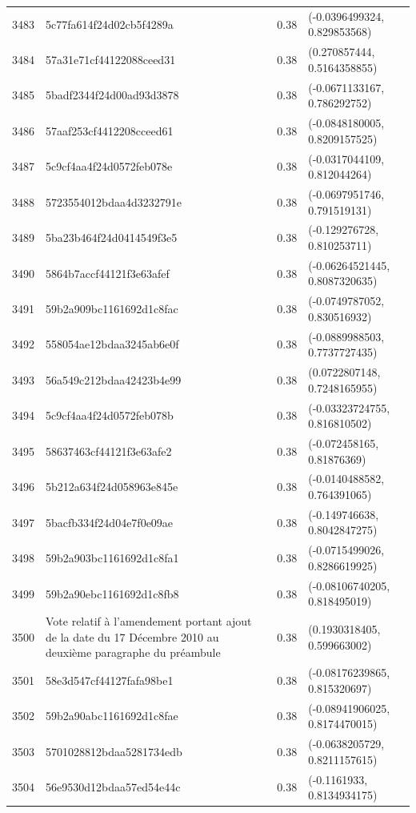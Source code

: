 \begin{table}[ht]
\begin{tabular}{rlrl}
  3483 & 5c77fa614f24d02cb5f4289a & 0.38 & (-0.0396499324, 0.829853568) \\ 
  3484 & 57a31e71cf44122088ceed31 & 0.38 & (0.270857444, 0.5164358855) \\ 
  3485 & 5badf2344f24d00ad93d3878 & 0.38 & (-0.0671133167, 0.786292752) \\ 
  3486 & 57aaf253cf4412208cceed61 & 0.38 & (-0.0848180005, 0.8209157525) \\ 
  3487 & 5c9cf4aa4f24d0572feb078e & 0.38 & (-0.0317044109, 0.812044264) \\ 
  3488 & 5723554012bdaa4d3232791e & 0.38 & (-0.0697951746, 0.791519131) \\ 
  3489 & 5ba23b464f24d0414549f3e5 & 0.38 & (-0.129276728, 0.810253711) \\ 
  3490 & 5864b7accf44121f3e63afef & 0.38 & (-0.06264521445, 0.8087320635) \\ 
  3491 & 59b2a909bc1161692d1c8fac & 0.38 & (-0.0749787052, 0.830516932) \\ 
  3492 & 558054ae12bdaa3245ab6e0f & 0.38 & (-0.0889988503, 0.7737727435) \\ 
  3493 & 56a549c212bdaa42423b4e99 & 0.38 & (0.0722807148, 0.7248165955) \\ 
  3494 & 5c9cf4aa4f24d0572feb078b & 0.38 & (-0.03323724755, 0.816810502) \\ 
  3495 & 58637463cf44121f3e63afe2 & 0.38 & (-0.072458165, 0.81876369) \\ 
  3496 & 5b212a634f24d058963e845e & 0.38 & (-0.0140488582, 0.764391065) \\ 
  3497 & 5bacfb334f24d04e7f0e09ae & 0.38 & (-0.149746638, 0.8042847275) \\ 
  3498 & 59b2a903bc1161692d1c8fa1 & 0.38 & (-0.0715499026, 0.8286619925) \\ 
  3499 & 59b2a90ebc1161692d1c8fb8 & 0.38 & (-0.08106740205, 0.818495019) \\ 
  3500 & Vote relatif à l'amendement portant ajout de la date du 17 Décembre 2010 au deuxième paragraphe du préambule & 0.38 & (0.1930318405, 0.599663002) \\ 
  3501 & 58e3d547cf44127fafa98be1 & 0.38 & (-0.08176239865, 0.815320697) \\ 
  3502 & 59b2a90abc1161692d1c8fae & 0.38 & (-0.08941906025, 0.8174470015) \\ 
  3503 & 5701028812bdaa5281734edb & 0.38 & (-0.0638205729, 0.8211157615) \\ 
  3504 & 56e9530d12bdaa57ed54e44c & 0.38 & (-0.1161933, 0.8134934175) \\ 

\end{tabular}
\end{table}
